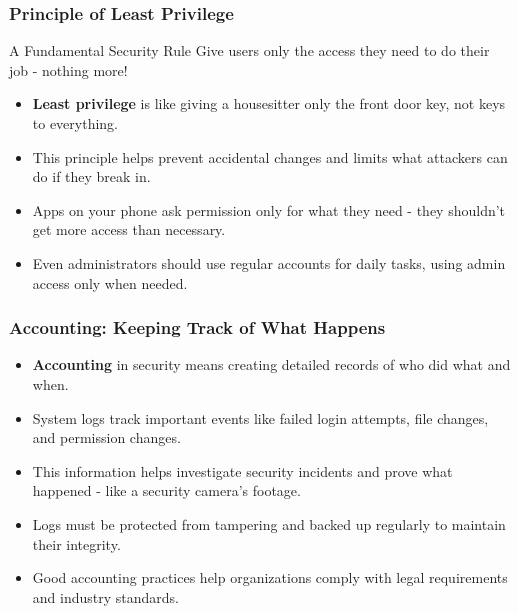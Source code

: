 \documentclass{beamer}
\begin{document}
\begin{frame}
    \frametitle{Principle of Least Privilege}
    \begin{block}{A Fundamental Security Rule}
        Give users only the access they need to do their job - nothing more!
    \end{block}
    \begin{itemize}
        \item \textbf{Least privilege} is like giving a housesitter only the front door key, not keys to everything.
        \item This principle helps prevent accidental changes and limits what attackers can do if they break in.
        \item Apps on your phone ask permission only for what they need - they shouldn't get more access than necessary.
        \item Even administrators should use regular accounts for daily tasks, using admin access only when needed.
    \end{itemize}
\end{frame}

\begin{frame}
    \frametitle{Accounting: Keeping Track of What Happens}
    \begin{itemize}
        \item \textbf{Accounting} in security means creating detailed records of who did what and when.
        \item System logs track important events like failed login attempts, file changes, and permission changes.
        \item This information helps investigate security incidents and prove what happened - like a security camera's footage.
        \item Logs must be protected from tampering and backed up regularly to maintain their integrity.
        \item Good accounting practices help organizations comply with legal requirements and industry standards.
    \end{itemize}
\end{frame}
\end{document}
